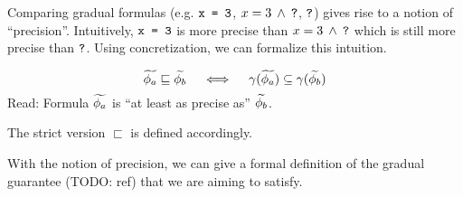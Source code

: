
Comparing gradual formulas (e.g. $\texttt{x = 3}$, $\texttt{$x = 3\:\wedge\:\texttt{?}$}$, $\texttt{?}$) gives rise to a notion of “precision”.
Intuitively, $\texttt{x = 3}$ is more precise than $\texttt{$x = 3\:\wedge\:\texttt{?}$}$ which is still more precise than $\texttt{?}$.
Using concretization, we can formalize this intuition.
\begin{definition}
    $$\widetilde{\phi_a} \sqsubseteq \widetilde{\phi_b}  \quad\iff\quad  \gamma(\widetilde{\phi_a}) \subseteq \gamma(\widetilde{\phi_b})$$
    Read: Formula $\widetilde{\phi_a}$ is “at least as precise as” $\widetilde{\phi_b}$.
\end{definition}
The strict version $\sqsubset$ is defined accordingly.

With the notion of precision, we can give a formal definition of the gradual guarantee (TODO: ref) that we are aiming to satisfy.
\begin{definition}
\label{grad-guarantee-def}
\end{definition}

